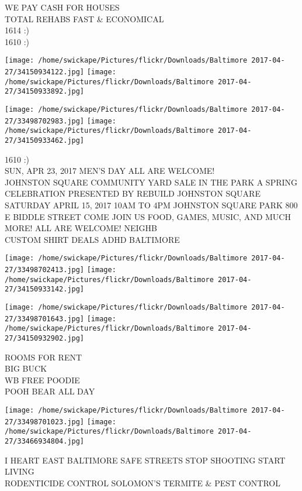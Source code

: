 \documentclass[10pt,letterpaper]{article}
\begin{document}
WE PAY CASH FOR HOUSES\\
TOTAL REHABS FAST \& ECONOMICAL\\
1614 :)\\
1610 :)\\
\pagebreak

\texttt{[image: /home/swickape/Pictures/flickr/Downloads/Baltimore 2017-04-27/34150934122.jpg]}
\texttt{[image: /home/swickape/Pictures/flickr/Downloads/Baltimore 2017-04-27/34150933892.jpg]}

\texttt{[image: /home/swickape/Pictures/flickr/Downloads/Baltimore 2017-04-27/33498702983.jpg]}
\texttt{[image: /home/swickape/Pictures/flickr/Downloads/Baltimore 2017-04-27/34150933462.jpg]}

1610 :)\\
SUN, APR 23, 2017 MEN'S DAY ALL ARE WELCOME!\\
JOHNSTON SQUARE COMMUNITY YARD SALE IN THE PARK A SPRING CELEBRATION PRESENTED BY REBUILD JOHNSTON SQUARE SATURDAY APRIL 15, 2017 10AM TO 4PM JOHNSTON SQUARE PARK 800 E BIDDLE STREET COME JOIN US FOOD, GAMES, MUSIC, AND MUCH MORE! ALL ARE WELCOME!  NEIGHB\\
CUSTOM SHIRT DEALS ADHD BALTIMORE\\
\pagebreak

\texttt{[image: /home/swickape/Pictures/flickr/Downloads/Baltimore 2017-04-27/33498702413.jpg]}
\texttt{[image: /home/swickape/Pictures/flickr/Downloads/Baltimore 2017-04-27/34150933142.jpg]}

\texttt{[image: /home/swickape/Pictures/flickr/Downloads/Baltimore 2017-04-27/33498701643.jpg]}
\texttt{[image: /home/swickape/Pictures/flickr/Downloads/Baltimore 2017-04-27/34150932902.jpg]}

ROOMS FOR RENT\\
BIG BUCK\\
WB FREE POODIE\\
POOH BEAR ALL DAY\\
\pagebreak

\texttt{[image: /home/swickape/Pictures/flickr/Downloads/Baltimore 2017-04-27/33498701023.jpg]}
\texttt{[image: /home/swickape/Pictures/flickr/Downloads/Baltimore 2017-04-27/33466934804.jpg]}

I HEART EAST BALTIMORE SAFE STREETS STOP SHOOTING START LIVING\\
RODENTICIDE CONTROL SOLOMON'S TERMITE \& PEST CONTROL\\
\pagebreak
\end{document}
